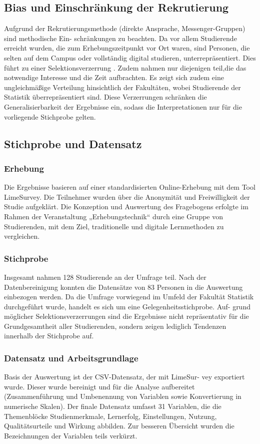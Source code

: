 \documentclass[a4paper, 12pt]{article}
\begin{document}
\subsection{Bias und Einschränkung der Rekrutierung}
Aufgrund der Rekrutierungsmethode (direkte Ansprache, Messenger-Gruppen) sind methodische Ein- schränkungen zu beachten. Da vor allem Studierende erreicht wurden, die zum Erhebungszeitpunkt vor Ort waren, sind Personen, die selten auf dem Campus oder vollständig digital studieren, unterrepräsentiert. Dies führt zu einer Selektionsverzerrung . Zudem nahmen nur diejenigen teil,die das notwendige Interesse und die Zeit aufbrachten. Es zeigt sich zudem eine ungleichmäßige Verteilung hinsichtlich der Fakultäten, wobei Studierende der Statistik überrepräsentiert sind. Diese Verzerrungen schränken die Generalisierbarkeit der Ergebnisse ein, sodass die Interpretationen nur für die vorliegende Stichprobe gelten.

\subsection{Stichprobe und Datensatz}

\subsubsection{Erhebung}
Die Ergebnisse basieren auf einer standardisierten Online-Erhebung mit dem Tool LimeSurvey. Die Teilnehmer wurden über die Anonymität und Freiwilligkeit der Studie aufgeklärt. Die Konzeption und Auswertung des Fragebogens erfolgte im Rahmen der Veranstaltung „Erhebungstechnik“ durch eine Gruppe von Studierenden, mit dem Ziel, traditionelle und digitale Lernmethoden zu vergleichen.

\subsubsection{Stichprobe}
Insgesamt nahmen 128 Studierende an der Umfrage teil. Nach der Datenbereinigung konnten die Datensätze von 83 Personen in die Auswertung einbezogen werden. Da die Umfrage vorwiegend im Umfeld der Fakultät Statistik durchgeführt wurde, handelt es sich um eine Gelegenheitsstichprobe. Auf- grund möglicher Selektionsverzerrungen sind die Ergebnisse nicht repräsentativ für die Grundgesamtheit aller Studierenden, sondern zeigen lediglich Tendenzen innerhalb der Stichprobe auf.

\subsubsection{Datensatz und Arbeitsgrundlage}
Basis der Auswertung ist der CSV-Datensatz, der mit LimeSur- vey exportiert wurde. Dieser wurde bereinigt und für die Analyse aufbereitet (Zusammenführung und Umbenennung von Variablen sowie Konvertierung in numerische Skalen). Der finale Datensatz umfasst 31 Variablen, die die Themenblöcke Studienmerkmale, Lernerfolg, Einstellungen, Nutzung, Qualitätsurteile und Wirkung abbilden. Zur besseren Übersicht wurden die Bezeichnungen der Variablen teils verkürzt.
\end{document}
